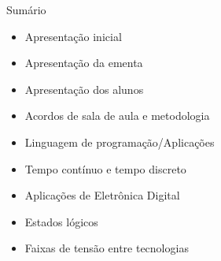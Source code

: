 
\begin{frame}{Sumário}
    \begin{itemize}
        \item Apresentação inicial
        \item Apresentação da ementa
        \item Apresentação dos alunos
        \item Acordos de sala de aula e metodologia
        \item Linguagem de programação/Aplicações
        \item Tempo contínuo e tempo discreto
        \item Aplicações de Eletrônica Digital
        \item Estados lógicos
        \item Faixas de tensão entre tecnologias
    \end{itemize}
\end{frame}